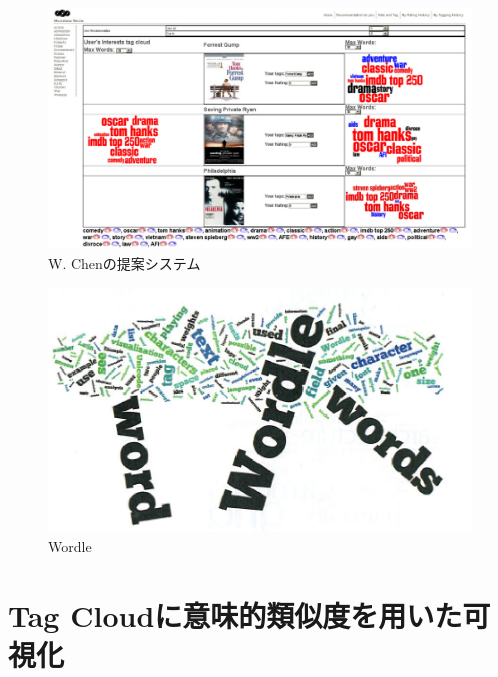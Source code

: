 \documentclass[sotsuron]{kuee}
\begin{document}
\begin{figure}
  \begin{center}
    \unitlength=1mm
   \includegraphics[width=120mm]{fig2-2.eps}
  \end{center}
  \caption{W. Chenの提案システム}
  \label{2-2}
\end{figure}

\begin{figure}
  \begin{center}
    \unitlength=1mm
   \includegraphics[width=120mm]{fig2-3.eps}
  \end{center}
  \caption{Wordle}
  \label{2-3}
\end{figure}


\section{Tag Cloudに意味的類似度を用いた可視化}
\end{document}
